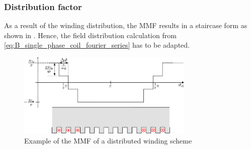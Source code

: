 \begin{frame}
	\frametitle{Distribution factor}
    As a result of the winding distribution, the MMF results in a staircase form as shown in . Hence, the field distribution calculation from \eqref{eq:B_single_phase_coil_fourier_series} has to be adapted. 
    \begin{figure}
        \centering
        \includegraphics[width=0.75\textwidth]{fig/lec05/Distributed_winding_MMF.pdf}
        \caption{Example of the MMF of a distributed winding scheme}
        \label{fig:Distributed_winding_MMF}
    \end{figure}
\end{frame}

